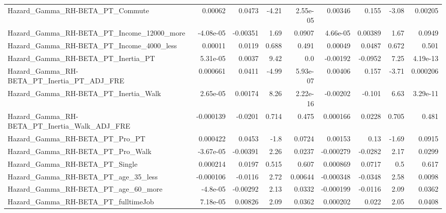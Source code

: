\begin{tabular}{lrrrrrrrr}
Hazard\_Gamma\_RH-BETA\_PT\_Commute                    &     0.00062 &       0.0473 &    -4.21 & 2.55e-05 &    0.00346 &       0.155 &        -3.08 &       0.00205 \\
Hazard\_Gamma\_RH-BETA\_PT\_Income\_12000\_more          &   -4.08e-05 &     -0.00351 &     1.69 &   0.0907 &   4.66e-05 &     0.00389 &         1.67 &        0.0949 \\
Hazard\_Gamma\_RH-BETA\_PT\_Income\_4000\_less           &     0.00011 &       0.0119 &    0.688 &    0.491 &    0.00049 &      0.0487 &        0.672 &         0.501 \\
Hazard\_Gamma\_RH-BETA\_PT\_Inertia\_PT                 &    5.31e-05 &       0.0037 &     9.42 &      0.0 &   -0.00192 &     -0.0952 &         7.25 &      4.19e-13 \\
Hazard\_Gamma\_RH-BETA\_PT\_Inertia\_PT\_ADJ\_FRE         &    0.000661 &       0.0411 &    -4.99 & 5.93e-07 &    0.00406 &       0.157 &        -3.71 &      0.000206 \\
Hazard\_Gamma\_RH-BETA\_PT\_Inertia\_Walk               &    2.65e-05 &      0.00174 &     8.26 & 2.22e-16 &   -0.00202 &      -0.101 &         6.63 &      3.29e-11 \\
Hazard\_Gamma\_RH-BETA\_PT\_Inertia\_Walk\_ADJ\_FRE       &   -0.000139 &      -0.0201 &    0.714 &    0.475 &   0.000166 &      0.0228 &        0.705 &         0.481 \\
Hazard\_Gamma\_RH-BETA\_PT\_Pro\_PT                     &    0.000422 &       0.0453 &     -1.8 &   0.0724 &    0.00153 &        0.13 &        -1.69 &        0.0915 \\
Hazard\_Gamma\_RH-BETA\_PT\_Pro\_Walk                   &   -3.67e-05 &     -0.00391 &     2.26 &   0.0237 &  -0.000279 &     -0.0282 &         2.17 &        0.0299 \\
Hazard\_Gamma\_RH-BETA\_PT\_Single                     &    0.000214 &       0.0197 &    0.515 &    0.607 &   0.000869 &      0.0717 &          0.5 &         0.617 \\
Hazard\_Gamma\_RH-BETA\_PT\_age\_35\_less                &   -0.000106 &      -0.0116 &     2.72 &  0.00644 &  -0.000348 &     -0.0348 &         2.58 &        0.0098 \\
Hazard\_Gamma\_RH-BETA\_PT\_age\_60\_more                &    -4.8e-05 &     -0.00292 &     2.13 &   0.0332 &  -0.000199 &     -0.0116 &         2.09 &        0.0362 \\
Hazard\_Gamma\_RH-BETA\_PT\_fulltimeJob                &    7.18e-05 &      0.00826 &     2.09 &   0.0362 &   0.000202 &       0.022 &         2.05 &        0.0408 \\

\end{tabular}
